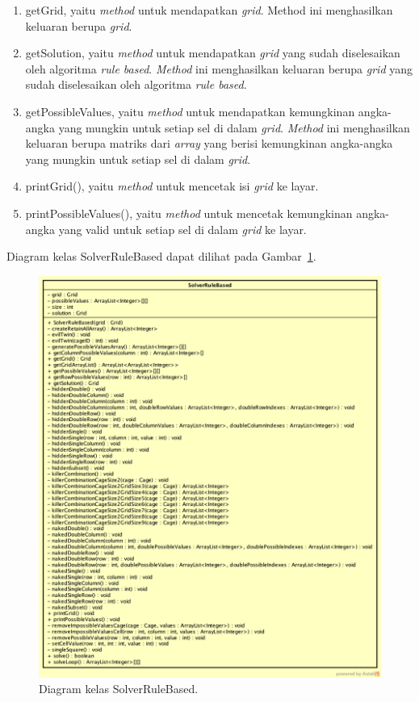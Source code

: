 \begin{enumerate}
\item getGrid, yaitu \textit{method} untuk mendapatkan \textit{grid}. Method ini menghasilkan keluaran berupa \textit{grid}.
\item getSolution, yaitu \textit{method} untuk mendapatkan \textit{grid} yang sudah diselesaikan oleh algoritma \textit{rule based}. \textit{Method} ini menghasilkan keluaran berupa \textit{grid} yang sudah diselesaikan oleh algoritma \textit{rule based}.
\item getPossibleValues, yaitu \textit{method} untuk mendapatkan kemungkinan angka-angka yang mungkin untuk setiap sel di dalam \textit{grid}. \textit{Method} ini menghasilkan keluaran berupa matriks dari \textit{array} yang berisi kemungkinan angka-angka yang mungkin untuk setiap sel di dalam \textit{grid}.
\item printGrid(), yaitu \textit{method} untuk mencetak isi \textit{grid} ke layar.
\item printPossibleValues(), yaitu \textit{method} untuk mencetak kemungkinan angka-angka yang valid untuk setiap sel di dalam \textit{grid} ke layar.
\end{enumerate}

Diagram kelas SolverRuleBased dapat dilihat pada Gambar~\ref{fig:diagramkelassolverrb}.

\begin{figure}
\centering
\captionsetup{justification=centering}
\includegraphics[scale=0.4]{Gambar/Perancangan/DiagramKelasSolverRuleBased.png}
\caption[Diagram kelas SolverRuleBased.]{Diagram kelas SolverRuleBased.}
\label{fig:diagramkelassolverrb}
\end{figure}


